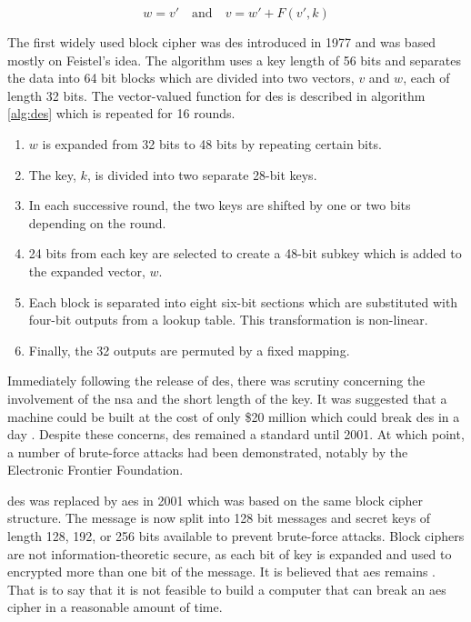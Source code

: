 \begin{equation}
	w = v' \quad \text{and} \quad v = w' + F(v', k)
\end{equation}

The first widely used block cipher was \ac{des} introduced in 1977 \cite{DES1977} and was based mostly on Feistel's idea. The algorithm uses a key length of 56 bits and separates the data into 64 bit blocks which are divided into two vectors, $v$ and $w$, each of length 32 bits. The vector-valued function for \ac{des} is described in algorithm \ref{alg:des} which is repeated for 16 rounds.

\begin{algorithm}
\label{alg:des}
\begin{enumerate}
	\item $w$ is expanded from 32 bits to 48 bits by repeating certain bits.
	\item The key, $k$, is divided into two separate 28-bit keys. 
	\item In each successive round, the two keys are shifted by one or two bits depending on the round.
	\item 24 bits from each key are selected to create a 48-bit subkey which is added to the expanded vector, $w$. 
	\item Each block is separated into eight six-bit sections which are substituted with four-bit outputs from a lookup table. This transformation is non-linear.
	\item Finally, the 32 outputs are permuted by a fixed mapping.
\end{enumerate}
\end{algorithm}

Immediately following the release of \ac{des}, there was scrutiny concerning the involvement of the \ac{nsa} and the short length of the key. It was suggested that a machine could be built at the cost of only \$20 million which could break \ac{des} in a day \cite{Diffie1977}. Despite these concerns, \ac{des} remained a standard until 2001. At which point, a number of brute-force attacks had been demonstrated, notably by the Electronic Frontier Foundation. 

\Ac{des} was replaced by \ac{aes} in 2001 \cite{aes2001} which was based on the same block cipher structure. The message is now split into 128 bit messages and secret keys of length 128, 192, or 256 bits available to prevent brute-force attacks. Block ciphers are not information-theoretic secure, as each bit of key is expanded and used to encrypted more than one bit of the message. It is believed that \ac{aes} remains . That is to say that it is not feasible to build a computer that can break an \ac{aes} cipher in a reasonable amount of time. 

